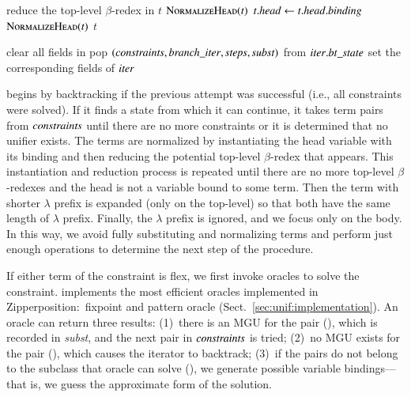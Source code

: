 \begin{algorithmic}[]
  \newpage
  
      \State reduce the top-level $\beta$-redex in $t$
      \State \Return $\textsc{NormalizeHead}(t)$
      \State $\mathit{t.head} \gets \mathit{t.head.binding}$
      \State \Return $\textsc{NormalizeHead}(t)$
    \Else{}
      \State \Return $t$
    \EndIf
  \EndFunction
  
  \vspace{\jot}
      \State clear all fields in 
      \State \Return {}
    \Else
    \State pop $(\mathit{constraints}, \mathit{branch\_iter}, \mathit{steps}, \mathit{subst})$ from $\mathit{iter.bt\_state}$
    \State set the corresponding fields of $\mathit{iter}$
    \State \Return {}
    \EndIf
  \EndFunction
  \vspace{\jot}
  
\end{algorithmic} 

 begins by backtracking if the previous attempt was successful (i.e., 
all constraints were solved). If it finds a state from which it can continue,
it takes term pairs from $\mathit{constraints}$ until
there are no more constraints or it is determined that no unifier exists. The terms
are normalized by instantiating the head variable with its binding and then
reducing the potential top-level $\beta$-redex that appears. This instantiation
and reduction process is repeated
until there are no more top-level $\beta$-redexes and the head is
not a variable bound to some term. Then the term with shorter
$\lambda$ prefix is expanded (only on the top-level) so that both have the
same length of $\lambda$ prefix. Finally, the $\lambda$ prefix is ignored, and we
focus only on the body. In this way, we avoid fully substituting
and normalizing terms and perform just enough operations
to determine the next step of the procedure.

If either term of the constraint is flex, we first invoke oracles to solve the
constraint. \ehohii{} implements the most efficient oracles implemented in
Zipperposition:\ fixpoint and pattern oracle (Sect.~\ref{sec:unif:implementation}). An oracle can return three results:
(1)~there is an MGU for the pair (), which is recorded in
\emph{subst}, and the next pair in $\emph{constraints}$ is tried;
(2)~no MGU exists
for the pair (), which causes the iterator to backtrack;
(3)~if the pairs do not belong to the subclass that oracle
can solve (), we generate possible variable bindings---that is,
we guess the approximate form of the solution.

